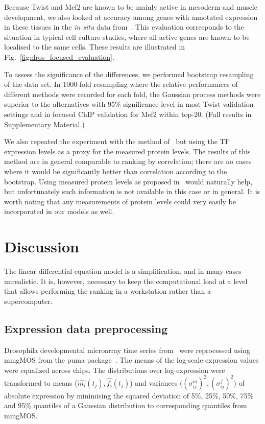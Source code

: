 \documentclass{pnastwo}
\begin{document}
\begin{article}
Because Twist and Mef2 are known to be mainly active in mesoderm and
muscle development, we also looked at accuracy among genes
with annotated expression in these tissues in the
\emph{in situ} data from~\cite{Tomancak2002}.
This evaluation corresponds to
the situation in typical cell culture studies, where all active genes
are known to be localised to the same cells.
These results are illustrated in Fig.~\ref{fig:dros_focused_evaluation}.


To assess the significance of the differences, we performed bootstrap
resampling of the data set.  In 1000-fold resampling where the
relative performances of different methods were recorded for each
fold, the Gaussian process methods were superior to the alternatives
with 95\% significance level in most Twist validation settings and in
focused ChIP validation for Mef2 within top-20.  (Full results in
Supplementary Material.)

We also repeated the experiment with the method of~\cite{Gatta2008}
but using the TF expression levels as a proxy for the measured protein
levels.  The results of this method are in general comparable to
ranking by correlation; there are no cases where it would be
significantly better than correlation according to the bootstrap.
Using measured protein levels as proposed in~\cite{Gatta2008} would
naturally help, but unfortunately such information is not available in
this case or in general.  It is worth noting that any measurements of
protein levels could very easily be incorporated in our models as well.

\section{Discussion}

The linear differential equation model is a simplification, and in
many cases unrealistic. It is, however, necessary to keep the
computational load at a level that allows performing the ranking in a
workstation rather than a supercomputer.

\begin{materials}
  \section{Expression data preprocessing} Drosophila developmental
  microarray time series from~\cite{Tomancak2002} were reprocessed
  using mmgMOS from the puma package~\cite{Pearson2009}.  The means of
  the log-scale expression values were equalized across chips.  The
  distributions over log-expression were transformed to means
  ($\hat{m_i}(t_j), \hat{f_i}(t_j)$) and variances ($(\sigma^m_{ij})^2,
  (\sigma^f_{ij})^2$) of absolute expression by minimising the squared
  deviation of 5\%, 25\%, 50\%, 75\% and 95\% quantiles of a Gaussian
  distribution to corresponding quantiles from mmgMOS.


\end{materials}
\end{article}
\end{document}
